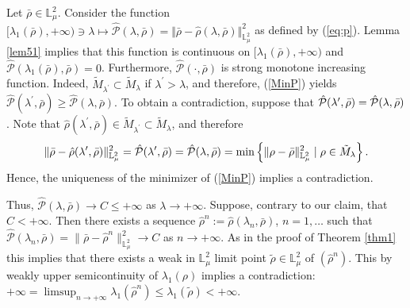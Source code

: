 \documentclass[12pt,thmsa]{article}
\begin{document}
Let $\bar{\rho}\in \mathbb{L}_{\mu }^{2}$. Consider the function $[\lambda
_{1}(\bar{\rho}),+\infty )\ni \lambda \mapsto \hat{\mathcal{P}}(\lambda ,%
\bar{\rho})=\Vert \bar{\rho}-\hat{\rho}(\lambda ,\bar{\rho})\Vert _{\mathbb{L%
}_{\mu }^{2}}^{2}$ as defined by (\ref{eq:p}). Lemma \ref{lem51} implies
that this function is continuous on $[\lambda _{1}(\bar{\rho}),+\infty )$
and $\hat{\mathcal{P}}(\lambda _{1}(\bar{\rho}),\bar{\rho})=0$. Furthermore,
$\hat{\mathcal{P}}(\cdot ,\bar{\rho})$ is strong monotone increasing
function. Indeed, $\tilde{M}_{\lambda ^{\prime }}\subset \tilde{M}_{\lambda
} $ if $\lambda ^{\prime }>\lambda $, and therefore, (\ref{MinP}) yields $%
\hat{\mathcal{P}}(\lambda ^{\prime },\bar{\rho})\geq \hat{\mathcal{P}}%
(\lambda ,\bar{\rho})$. To obtain a contradiction, suppose that $\hat{%
\mathcal{P}}(\lambda ^{\prime },\bar{\rho})=\hat{\mathcal{P}}(\lambda ,\bar{%
\rho})$. Note that $\hat{\rho}(\lambda ^{\prime },\bar{\rho})\in \tilde{M}%
_{\lambda ^{\prime }}\subset \tilde{M}_{\lambda }$, and therefore
\begin{equation*}
\Vert \bar{\rho}-\hat{\rho}(\lambda ^{\prime },\bar{\rho})\Vert _{\mathbb{L}%
_{\mu }^{2}}^{2}=\hat{\mathcal{P}}(\lambda ^{\prime },\bar{\rho})=\hat{%
\mathcal{P}}(\lambda ,\bar{\rho})=\min \left\{ \Vert \rho -\bar{\rho}\Vert _{%
\mathbb{L}_{\mu }^{2}}^{2}\mid \rho \in \tilde{M}_{\lambda }\right\} .
\end{equation*}%
Hence, the uniqueness of the minimizer of (\ref{MinP}) implies a
contradiction.

Thus, $\hat{\mathcal{P}}(\lambda, \bar{\rho}) \to C\leq +\infty$ as $\lambda
\to +\infty$. Suppose, contrary to our claim, that $C<+\infty$. Then there
exists a sequence $\hat{\rho}^n:=\hat{\rho}(\lambda_n, \bar{\rho})$, $%
n=1,\ldots$ such that $\hat{\mathcal{P}}(\lambda_n, \bar{\rho})=\| \bar{\rho}
- \hat{\rho}^n \|_{\mathbb{L}_{\mu}^{2}}^{2} \to C$ as $n\to +\infty$. As in
the proof of Theorem \ref{thm1} this implies that there exists a weak in $%
\mathbb{L}_{\mu}^{2}$ limit point $\tilde{\rho} \in \mathbb{L}_{\mu}^{2}$ of
$(\hat{\rho}^n)$. This by weakly upper semicontinuity of $\lambda_1(\rho)$
implies a contradiction: $+\infty =\limsup_{n\to +\infty} \lambda_1(\hat{\rho%
}^n)\leq \lambda_1(\tilde{\rho})<+\infty$.
\end{document}
